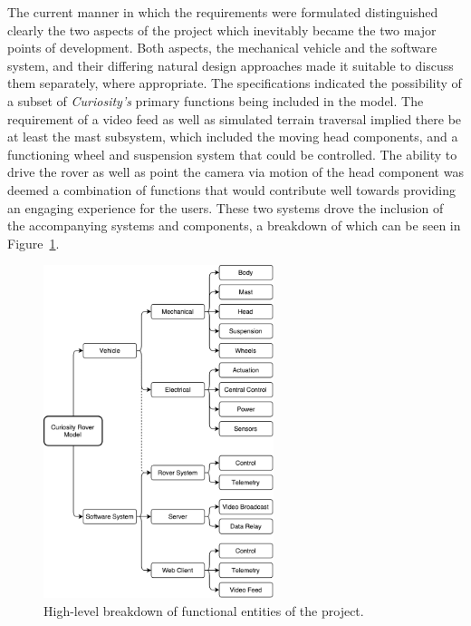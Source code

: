     The current manner in which the requirements were formulated distinguished clearly the two aspects of the project which inevitably became the two major points of development. Both aspects, the mechanical vehicle and the software system, and their differing natural design approaches made it suitable to discuss them separately, where appropriate. The specifications indicated the possibility of a subset of \textit{Curiosity's} primary functions being included in the model. The requirement of a video feed as well as simulated terrain traversal implied there be at least the mast subsystem, which included the moving head components, and a functioning wheel and suspension system that could be controlled. The ability to drive the rover as well as point the camera via motion of the head component was deemed a combination of functions that would contribute well towards providing an engaging experience for the users. These two systems drove the inclusion of the accompanying systems and components, a breakdown of which can be seen in Figure~\ref{fig:specs-functionalBreakdown}.

    \begin{figure}[h]
      \centering
      \includegraphics[width=0.6\textwidth]{figures/specs-functionalBreakdown}
      \caption[High-level breakdown of functional entities of the project.]{High-level breakdown of functional entities of the project.}
      \label{fig:specs-functionalBreakdown}
    \end{figure}


